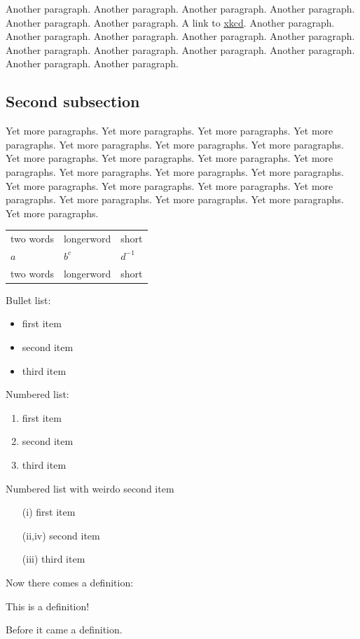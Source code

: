 Another paragraph.  Another paragraph.  Another paragraph.
Another paragraph.  Another paragraph.  Another paragraph.
A link to \href{http://www.xkcd.com/}{xkcd}.
Another paragraph.  Another paragraph.  Another paragraph.
Another paragraph.  Another paragraph.  Another paragraph.
Another paragraph.  Another paragraph.  Another paragraph.
Another paragraph.  Another paragraph.

\subsection{Second subsection}

Yet more paragraphs.  Yet more paragraphs.  Yet more %
paragraphs.  Yet more paragraphs.  Yet more paragraphs.  Yet
more paragraphs.  Yet more paragraphs.  Yet more paragraphs.
Yet more paragraphs.  Yet more paragraphs.  Yet more
paragraphs.  Yet more paragraphs.  Yet more paragraphs.  Yet
more paragraphs.  Yet more paragraphs.  Yet more paragraphs.
Yet more paragraphs.  Yet more paragraphs.  Yet more
paragraphs.  Yet more paragraphs.  Yet more paragraphs.  Yet
more paragraphs.

\begin{tabular}{lll}
	two words & longerword & short \\
	$a$ & $b^c$ & $d^{-1}$ \\
	two words & longerword & short \\
\end{tabular}

Bullet list:
\begin{itemize}
	\item first item
	\item second item
	\item third item
\end{itemize}


Numbered list:
\begin{enumerate}
	\item first item
	\item second item
	\item third item
\end{enumerate}

Numbered list with weirdo second item
\begin{enumerate}
	\item[(i)] first item
	\item[(ii,iv)] second item
	\item[(iii)] third item
\end{enumerate}

Now there comes a definition:

\begin{definition}
	This is a definition!
\end{definition}

Before it came a definition.

